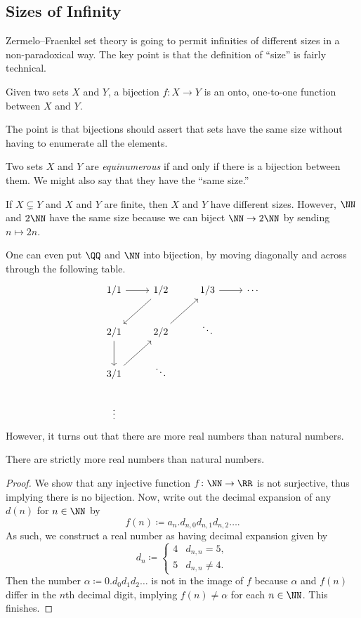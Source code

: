 \documentclass[../notes.tex]{subfiles}
\begin{document}
\subsection{Sizes of Infinity}
Zermelo--Fraenkel set theory is going to permit infinities of different sizes in a non-paradoxical way. The key point is that the definition of ``size'' is fairly technical.
\begin{definition}[Bijection]
	Given two sets $X$ and $Y$, a bijection $f\colon X\to Y$ is an onto, one-to-one function between $X$ and $Y$.
\end{definition}
The point is that bijections should assert that sets have the same size without having to enumerate all the elements.
\begin{definition}[Equinumerous]
	Two sets $X$ and $Y$ are \textit{equinumerous} if and only if there is a bijection between them. We might also say that they have the ``same size.''
\end{definition}
\begin{remark}
	If $X\subsetneq Y$ and $X$ and $Y$ are finite, then $X$ and $Y$ have different sizes. However, $\NN$ and $2\NN$ have the same size because we can biject $\NN\to2\NN$ by sending $n\mapsto2n$.
\end{remark}
One can even put $\QQ$ and $\NN$ into bijection, by moving diagonally and across through the following table.
\[\begin{tikzcd}
	{1/1} & {1/2} & {1/3} & \cdots \\
	{2/1} & {2/2} & \ddots \\
	{3/1} & \ddots \\
	\vdots
	\arrow[from=1-1, to=1-2]
	\arrow[from=1-2, to=2-1]
	\arrow[from=2-1, to=3-1]
	\arrow[from=3-1, to=2-2]
	\arrow[from=2-2, to=1-3]
	\arrow[from=1-3, to=1-4]
\end{tikzcd}\]
However, it turns out that there are more real numbers than natural numbers.
\begin{proposition}
	There are strictly more real numbers than natural numbers.
\end{proposition}
\begin{proof}
	We show that any injective function $f\colon\NN\to\RR$ is not surjective, thus implying there is no bijection. Now, write out the decimal expansion of any $d(n)$ for $n\in\NN$ by
	\[f(n)\coloneqq a_{n}.d_{n,0}d_{n,1}d_{n,2}\ldots.\]
	As such, we construct a real number as having decimal expansion given by
	\[d_n\coloneqq\begin{cases}
		4 & d_{n,n}=5, \\
		5 & d_{n,n}\ne 4.
	\end{cases}\]
	Then the number $\alpha\coloneqq0.d_0d_1d_2\ldots$ is not in the image of $f$ because $\alpha$ and $f(n)$ differ in the $n$th decimal digit, implying $f(n)\ne\alpha$ for each $n\in\NN$. This finishes.
\end{proof}
\end{document}
